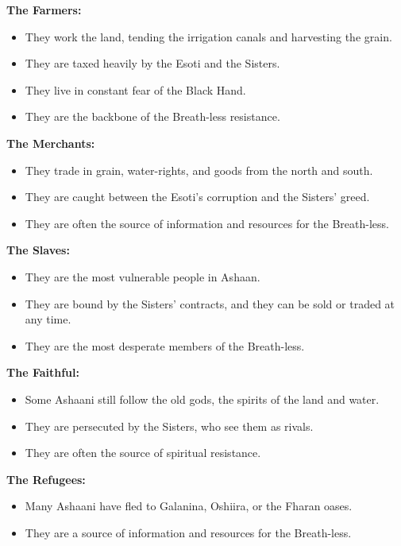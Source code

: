 \documentclass[11pt,twoside]{book}
\newenvironment{mechanicbox}{\begin{mdframed}[style=mechanicbox]}{\end{mdframed}}
\begin{document}
\begin{mechanicbox}
\textbf{The Farmers:}
\begin{itemize}
    \item They work the land, tending the irrigation canals and harvesting the grain.
    \item They are taxed heavily by the Esoti and the Sisters.
    \item They live in constant fear of the Black Hand.
    \item They are the backbone of the Breath-less resistance.
\end{itemize}

\textbf{The Merchants:}
\begin{itemize}
    \item They trade in grain, water-rights, and goods from the north and south.
    \item They are caught between the Esoti's corruption and the Sisters' greed.
    \item They are often the source of information and resources for the Breath-less.
\end{itemize}

\textbf{The Slaves:}
\begin{itemize}
    \item They are the most vulnerable people in Ashaan.
    \item They are bound by the Sisters' contracts, and they can be sold or traded at any time.
    \item They are the most desperate members of the Breath-less.
\end{itemize}

\textbf{The Faithful:}
\begin{itemize}
    \item Some Ashaani still follow the old gods, the spirits of the land and water.
    \item They are persecuted by the Sisters, who see them as rivals.
    \item They are often the source of spiritual resistance.
\end{itemize}

\textbf{The Refugees:}
\begin{itemize}
    \item Many Ashaani have fled to Galanina, Oshiira, or the Fharan oases.
    \item They are a source of information and resources for the Breath-less.
\end{itemize}
\end{mechanicbox}
\end{document}
